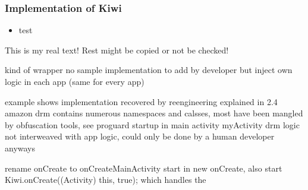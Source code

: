 \subsubsection{Implementation of Kiwi} \label{section:license-amazon-implementation}
\begin{itemize}
    \item test
\end{itemize}
This is my real text! Rest might be copied or not be checked!

%
kind of wrapper
no sample implementation to add by developer but inject own logic in each app (same for every app)

example shows implementation recovered by reengineering explained in 2.4
amazon drm contains numerous namespaces and calsses, most have been mangled by obfuscation tools, see proguard
startup in main activity myActivity
drm logic not interweaved with app logic, could only be done by a human developer anyways\cite{munteanLicense}
%




rename onCreate to onCreateMainActivity
start in new onCreate, also start Kiwi.onCreate((Activity) this, true); which handles the
